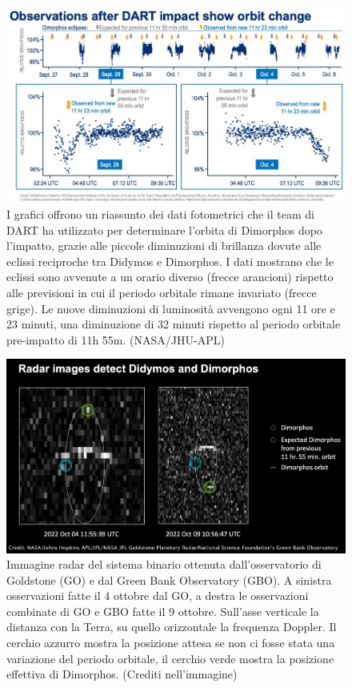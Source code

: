 \documentclass[a4paper,11pt,openright]{book}
\begin{document}
\begin{figure}
    \centering
    \includegraphics[width=\textwidth]{figure/impact_lightcurve.jpg}
    \caption[Riassunto dei dati fotometrici utilizzati per determinare l'orbita post-impatto.]{I grafici offrono un riassunto dei dati fotometrici che il team di DART ha utilizzato per determinare l'orbita di Dimorphos dopo l'impatto, grazie alle piccole diminuzioni di brillanza dovute alle eclissi reciproche tra Didymos e Dimorphos. I dati mostrano che le eclissi sono avvenute a un orario diverso (frecce arancioni) rispetto alle previsioni in cui il periodo orbitale rimane invariato (frecce grige). Le nuove diminuzioni di luminosità avvengono ogni 11 ore e 23 minuti, una diminuzione di 32 minuti rispetto al periodo orbitale pre-impatto di 11h 55m. (NASA/JHU-APL)}
    \label{fig:impact_lightcurve}
\end{figure}

\begin{figure}
    \centering
    \includegraphics[scale=0.25]{figure/expected_dimorphos.png}
    \caption[Immagine radar del sistema post-impatto.]{Immagine radar del sistema binario ottenuta dall'osservatorio di Goldstone (GO) e dal Green Bank Observatory (GBO). A sinistra osservazioni fatte il 4 ottobre dal GO, a destra le osservazioni combinate di GO e GBO fatte il 9 ottobre. Sull'asse verticale la distanza con la Terra, su quello orizzontale la frequenza Doppler. Il cerchio azzurro mostra la posizione attesa se non ci fosse stata una variazione del periodo orbitale, il cerchio verde mostra la posizione effettiva di Dimorphos. (Crediti nell'immagine)}
    \label{fig:expected_dimorphos}
\end{figure}
\end{document}
